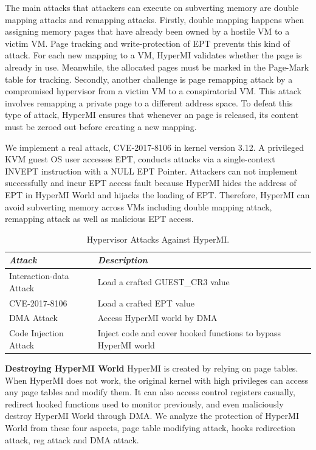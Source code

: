 \documentclass[conference]{IEEEtran}
\begin{document}
The main attacks that attackers can execute on subverting memory are double mapping attacks and remapping attacks.
Firstly, double mapping happens when assigning memory pages that have already been owned by a hostile VM to a victim VM. Page tracking and write-protection of EPT prevents this kind of attack. For each new mapping to a VM, HyperMI validates whether the page is already in use. Meanwhile, the allocated pages must be marked in the Page-Mark table for tracking. Secondly, another challenge is page remapping attack by a compromised hypervisor from a victim VM to a conspiratorial VM. This attack involves remapping a private page to a different address space. To defeat this type of attack, HyperMI ensures that whenever an page is released, its content must be zeroed out before creating a new mapping.


We implement a real attack, CVE-2017-8106 in kernel version 3.12. A privileged KVM guest OS user accesses EPT, conducts attacks via a single-context INVEPT instruction with a NULL EPT Pointer. Attackers can not implement successfully and incur EPT access fault because HyperMI hides the address of EPT in HyperMI World and hijacks the loading of EPT. Therefore, HyperMI can avoid subverting memory across VMs including double mapping attack, remapping attack as well as malicious EPT access.


\begin{table}
\centering
\caption{Hypervisor Attacks Against HyperMI.}\label{tab3}
\begin{tabular}{p{2.8cm}|p{5.5cm}}
\hline
{\itshape\bfseries Attack} & {\itshape\bfseries Description} \\
\hline
Interaction-data Attack & Load a crafted GUEST\_CR3 value\\
\hline
CVE-2017-8106 & Load a crafted EPT value \\
\hline
DMA Attack & Access HyperMI world by DMA \\
\hline
Code Injection Attack & Inject code and cover hooked functions to bypass HyperMI world \\
\hline
\end{tabular}
\end{table}

\textbf{Destroying HyperMI World}
HyperMI is created by relying on page tables. When HyperMI does not work, the original kernel with high privileges can access any page tables and modify them. It can also access control registers casually, redirect hooked functions used to monitor previously, and even maliciously destroy HyperMI World through DMA. We analyze the protection of HyperMI World from these four aspects, page table modifying attack, hooks redirection attack, reg attack and DMA attack.
\end{document}
